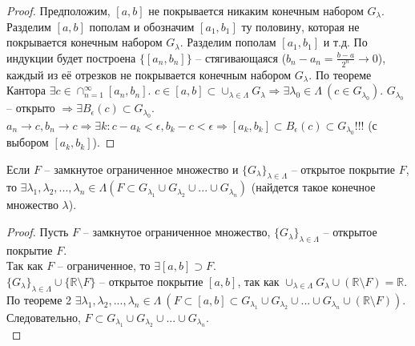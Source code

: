 \begin{proof}
    Предположим, $[a, b]$ не покрывается никаким конечным набором $G_{\lambda}$.
    Разделим $[a, b]$ пополам и обозначим $[a_1, b_1]$ ту половину, которая не покрывается конечным набором $G_{\lambda}$.
    Разделим пополам $[a_1, b_1]$ и т.д.
    По индукции будет построена $\{[a_{n}, b_{n}]\}$ -- стягивающаяся ($b_n-a_n = \frac{b-a}{2^{n}} \to 0$),
    каждый из её отрезков не покрывается конечным набором $G_{\lambda}$. По теореме Кантора $\exists c \in \cap_{n = 1}^{\infty}[a_n, b_n]$.
    $c \in [a, b] \subset \cup_{\lambda \in \Lambda} G_{\lambda} \Rightarrow \exists \lambda_0 \in \Lambda \ (c \in G_{\lambda_0})$. $G_{\lambda_0}$ -- открыто $\Rightarrow \exists B_{\epsilon}(c) \subset G_{\lambda_0}$.\\
    $a_{n} \to c, b_n \to c \Rightarrow \exists k : c - a_{k} < \epsilon, b_{k} - c < \epsilon \Rightarrow [a_k, b_k] \subset B_{\epsilon}(c) \subset G_{\lambda_0}$!!! (с выбором $[a_k, b_k]$).
\end{proof}

\begin{corollary}
    Если $F$ -- замкнутое ограниченное множество и $\{G_{\lambda}\}_{\lambda \in \Lambda}$ -- открытое покрытие $F$, то $\exists \lambda_1, \lambda_2, ..., \lambda_n \in \Lambda (F \subset G_{\lambda_1} \cup G_{\lambda_2} \cup ... \cup G_{\lambda_n})$ (найдется такое конечное множество $\lambda$).
\end{corollary}

\begin{proof}
    Пусть $F$ -- замкнутое ограниченное множество, $\{G_{\lambda}\}_{\lambda \in \Lambda}$ -- открытое покрытие $F$.\\
    Так как $F$ -- ограниченное, то $\exists [a, b] \supset F$.\\
    $\{G_{\lambda}\}_{\lambda \in \Lambda} \cup \{\mathds{R} \setminus F\}$ -- открытое покрытие $[a, b]$, так как $\cup_{\lambda \in \Lambda}G_{\lambda} \cup (\mathds{R} \setminus F) = \mathds{R}$.\\
    По теореме 2 $\exists \lambda_1, \lambda_2, ..., \lambda_n \in \Lambda \ (F \subset [a, b] \subset G_{\lambda_1} \cup G_{\lambda_2} \cup ... \cup G_{\lambda_n} \cup (\mathds{R} \setminus F))$.
    Следовательно, $F \subset G_{\lambda_1} \cup G_{\lambda_2} \cup ... \cup G_{\lambda_n}$.\\
\end{proof}

